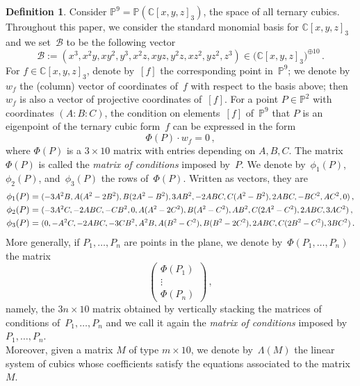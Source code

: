 \documentclass[a4paper, 11pt, reqno]{amsart}
\theoremstyle{plain}
\theoremstyle{definition}
\newtheorem{definition}[lemma]{Definition}
\newcommand{\C}{\mathbb{C}}
\newcommand{\p}{\mathbb{P}}
\newcommand\scalemath[2]{\scalebox{#1}{\mbox{\ensuremath{\displaystyle #2}}}}
\begin{document}
\begin{definition}
\label{definition:matrix_conditions}
Consider $\p^9 = \p(\C[x,y,z]_3)$, the space of all ternary cubics.
Throughout this paper, we consider the standard monomial basis for $\C[x,y,z]_3$ and we set~$\mathcal{B}$ to be the following vector
%
\begin{equation}
\label{eq:vector_basis}
  \mathcal{B} := (x^3, x^2 y, x y^2, y^3, x^2 z, x y z, y^2 z, x z^2, y z^2, z^3)
  \in \bigl( \C[x,y,z]_3 \bigr)^{\oplus 10} \,.
\end{equation}
For $f \in \C[x,y,z]_3$, denote by~$[f]$ the corresponding point in~$\p^9$; we denote by~$w_f$ the (column) vector of coordinates of~$f$ with respect to the basis above; then $w_f$ is also a vector of projective coordinates of~$[f]$.
For a point $P \in \p^2$ with coordinates $(A: B: C)$, the condition on elements~$[f]$ of~$\p^9$ that $P$ is an eigenpoint of the ternary cubic form~$f$ can be expressed in the form
%
\[
  \Phi(P) \cdot w_f = 0 \,,
\]
%
where $\Phi(P)$ is a $3 \times 10$ matrix with entries depending on $A, B, C$.
The matrix $\Phi(P)$ is called the \emph{matrix of conditions} imposed by~$P$.
We denote by~$\phi_1(P)$, $\phi_2(P)$, and~$\phi_3(P)$ the rows of~$\Phi(P)$.
Written as vectors, they are
%
\begin{equation}
\label{equation:matrix_conditions_rows}
  \begin{aligned}
    \phi_1(P) &=
    \scalemath{0.9}{
    (-3A^2B, A(A^2 - 2B^2), B(2A^2 - B^2), 3AB^2,
     -2ABC, C(A^2 - B^2), 2 ABC,
     -B C^2, A C^2, 0)} \,, \\
    \phi_2(P) &= 
    \scalemath{0.9}{
    (-3A^2 C,
     -2ABC,
     -CB^2,
     0,
     A(A^2-2C^2),
     B(A^2 - C^2),
     AB^2,
     C(2A^2-C^2),
     2ABC,
     3AC^2)} \,,\\
    \phi_3(P) &=
    \scalemath{0.9}{
    (0,
     -A^2C,
     -2ABC,
     -3CB^2,
     A^2 B,
     A(B^2 - C^2),
     B(B^2-2C^2),
     2ABC,
     C(2B^2-C^2),
     3BC^2)} \,.
  \end{aligned}
\end{equation}
%
More generally, if $P_1, \dotsc, P_n$ are points in the plane, we denote by~$\Phi(P_1, \dotsc, P_n)$ the matrix
%
\[
  \left(
  \begin{array}{c}
    \Phi(P_1) \\
    \vdots \\
    \Phi(P_n)
  \end{array}
  \right) \,,
\]
%
namely, the $3n \times 10$ matrix obtained by vertically stacking the
matrices of conditions of~$P_1, \dotsc, P_n$ and we call it again the
\emph{matrix of conditions} imposed by $P_1, \dotsc, P_n$. \\
Moreover, given a matrix $M$ of type $m \times 10$, we denote by~$\Lambda(M)$ the linear system of cubics whose coefficients
satisfy the equations associated to the matrix~$M$.
\end{definition}
\end{document}
